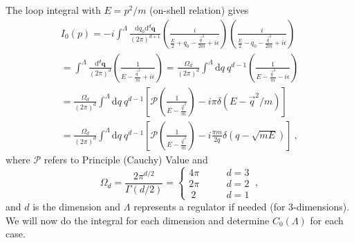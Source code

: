 \documentclass[11pt]{article}
\begin{document}
\noindent The loop integral with $E=p^2/m$ (on-shell relation) gives
\begin{multline}\label{eqn:I0 general}
I_0(p)=-i\int^\Lambda \frac { \mathrm {d}q_0 \mathrm { d } ^ { d } \mathbf { q } } { ( 2 \pi ) ^ { d+1 } } \left( \frac { i } { \frac{E}{2} + q _ { 0 } - \frac{\vec{q}^2}{2m} + i \epsilon } \right) \left( \frac { i } { \frac{E}{2} - q _ { 0 } - \frac{\vec{q}^2}{2m} + i \epsilon } \right)\\
=\int^\Lambda \frac { \mathrm { d } ^ { d  } \mathbf { q } } { ( 2 \pi ) ^ { d } } \left( \frac { 1 } { E - \frac{\vec{q}^2}{m} + i \epsilon } \right)
=\frac{\Omega_d}{(2\pi)^d}\int^\Lambda  \mathrm { d } q \ q^{d-1} \left( \frac { 1 } { E - \frac{\vec{q}^2}{m} - i \epsilon } \right)\\
=\frac{\Omega_d}{(2\pi)^d}\int^\Lambda  \mathrm { d } q \ q^{d-1}\left[\mathcal{P} \left( \frac { 1 } { E - \frac{\vec{q}^2}{m} } \right)
-i\pi\delta(E-\vec{q}^2/m)\right]\\
=\frac{\Omega_d}{(2\pi)^d}\int^\Lambda  \mathrm { d } q \ q^{d-1}\left[\mathcal{P} \left( \frac { 1 } { E - \frac{\vec{q}^2}{m} } \right)
-i\frac{\pi m}{2q}\delta(q-\sqrt{mE})\right]
\ ,
\end{multline}
where $\mathcal{P}$ refers to Principle (Cauchy) Value and
\begin{equation}
\Omega_d=\frac{2\pi^{d/2}}{\Gamma(d/2)}=
\begin{cases}
4\pi&\quad\quad d=3\\
2\pi&\quad\quad d=2\\
\ 2\ &\quad\quad d=1
\end{cases}\ ,
\end{equation}
and $d$ is the dimension and $\Lambda$ represents a regulator if needed (for 3-dimensions).  We will now do the integral for each dimension and determine $C_0(\Lambda)$ for each case.
\end{document}
